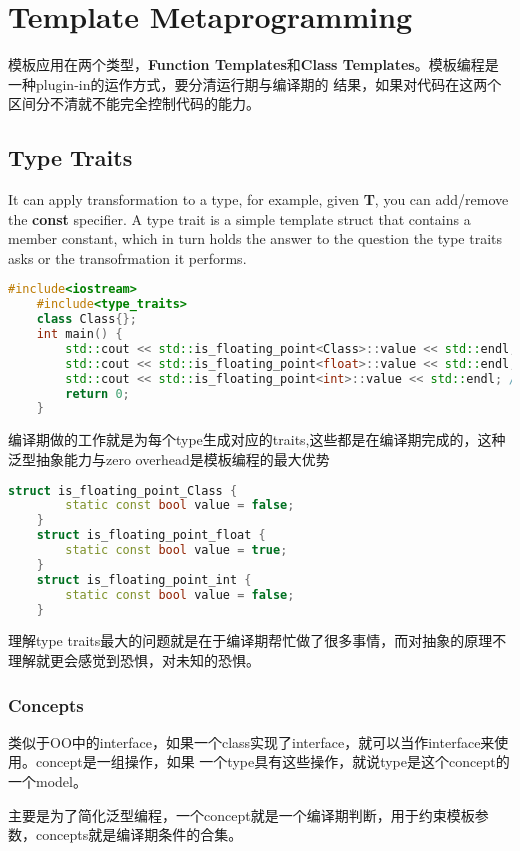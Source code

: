 \section{Template Metaprogramming}

模板应用在两个类型，\textbf{Function Templates}和\textbf{Class Templates}。模板编程是一种plugin-in的运作方式，要分清运行期与编译期的
结果，如果对代码在这两个区间分不清就不能完全控制代码的能力。

\subsection{Type Traits}
It can apply transformation to a type, for example, given \textbf{T}, you can add/remove the \textbf{const} specifier.
A type trait is a simple template struct that contains a member constant, which in turn holds the answer to the question
the type traits asks or the transofrmation it performs.
\begin{lstlisting}[language=c++]
    #include<iostream>
    #include<type_traits>
    class Class{};
    int main() {
        std::cout << std::is_floating_point<Class>::value << std::endl; // 0
        std::cout << std::is_floating_point<float>::value << std::endl; // 1
        std::cout << std::is_floating_point<int>::value << std::endl; // 0
        return 0;
    }
\end{lstlisting} 
编译期做的工作就是为每个type生成对应的traits,这些都是在编译期完成的，这种泛型抽象能力与zero overhead是模板编程的最大优势
\begin{lstlisting}[language=c++]
    struct is_floating_point_Class {
        static const bool value = false;
    }
    struct is_floating_point_float {
        static const bool value = true;
    }
    struct is_floating_point_int {
        static const bool value = false;
    }
\end{lstlisting} 
理解type traits最大的问题就是在于编译期帮忙做了很多事情，而对抽象的原理不理解就更会感觉到恐惧，对未知的恐惧。

\subsubsection{Concepts}
类似于OO中的interface，如果一个class实现了interface，就可以当作interface来使用。concept是一组操作，如果
一个type具有这些操作，就说type是这个concept的一个model。

主要是为了简化泛型编程，一个concept就是一个编译期判断，用于约束模板参数，concepts就是编译期条件的合集。


